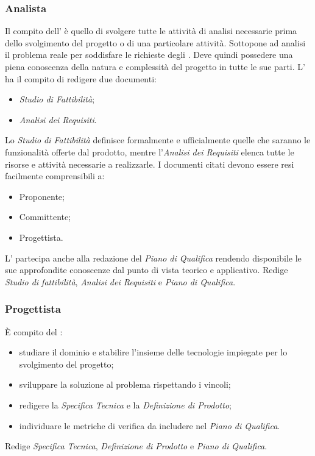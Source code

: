 \subsubsection{Analista}
Il compito dell'\Analista{} è quello di svolgere tutte le attività di analisi necessarie prima dello svolgimento del progetto o di una particolare attività. Sottopone ad analisi il problema reale per soddisfare le richieste degli . Deve quindi possedere una piena conoscenza della natura e complessità del progetto in tutte le sue parti. L'\Analista{} ha il compito di redigere due documenti:
\begin{itemize}
	\item \textit{Studio di Fattibilità};
	\item \textit{Analisi dei Requisiti}.
\end{itemize}
Lo \textit{Studio di Fattibilità} definisce formalmente e ufficialmente quelle che saranno le funzionalità offerte dal prodotto, mentre l'\textit{Analisi dei Requisiti} elenca tutte le risorse e attività necessarie a realizzarle. I documenti citati devono essere resi facilmente comprensibili a:
\begin{itemize}
	\item Proponente;
	\item Committente;
	\item Progettista.
\end{itemize}
L'\Analista{} partecipa anche alla redazione del \textit{Piano di Qualifica} rendendo disponibile le sue approfondite conoscenze dal punto di vista teorico e applicativo.
Redige \textit{Studio di fattibilità}, \textit{Analisi dei Requisiti} e \textit{Piano di Qualifica}.

\subsubsection{Progettista}
\`{E} compito del \Progettista:
\begin{itemize}
	\item studiare il dominio e stabilire l'insieme delle tecnologie impiegate per lo svolgimento del progetto;
	\item sviluppare la soluzione al problema rispettando i vincoli;
	\item redigere la \textit{Specifica Tecnica} e la \textit{Definizione di Prodotto};
	\item individuare le metriche di verifica da includere nel \textit{Piano di Qualifica}.
\end{itemize}
Redige \textit{Specifica Tecnica}, \textit{Definizione di Prodotto} e \textit{Piano di Qualifica}.

